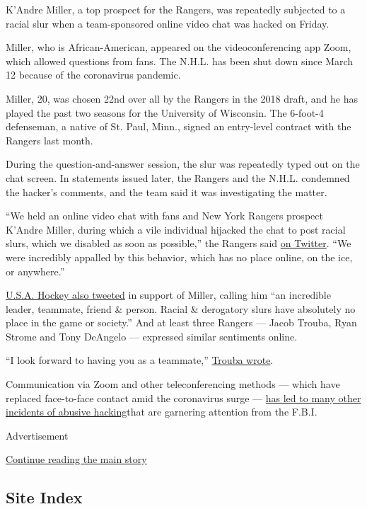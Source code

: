 K'Andre Miller, a top prospect for the Rangers, was repeatedly subjected
to a racial slur when a team-sponsored online video chat was hacked on
Friday.

Miller, who is African-American, appeared on the videoconferencing app
Zoom, which allowed questions from fans. The N.H.L. has been shut down
since March 12 because of the coronavirus pandemic.

Miller, 20, was chosen 22nd over all by the Rangers in the 2018 draft,
and he has played the past two seasons for the University of Wisconsin.
The 6-foot-4 defenseman, a native of St. Paul, Minn., signed an
entry-level contract with the Rangers last month.

During the question-and-answer session, the slur was repeatedly typed
out on the chat screen. In statements issued later, the Rangers and the
N.H.L. condemned the hacker's comments, and the team said it was
investigating the matter.

``We held an online video chat with fans and New York Rangers prospect
K'Andre Miller, during which a vile individual hijacked the chat to post
racial slurs, which we disabled as soon as possible,'' the Rangers said
\href{https://twitter.com/NYRangers/status/1246217625748697089?s=20}{on
Twitter}. ``We were incredibly appalled by this behavior, which has no
place online, on the ice, or anywhere.''

\href{https://twitter.com/usahockey/status/1246238904103002112?s=20}{U.S.A.
Hockey also tweeted} in support of Miller, calling him ``an incredible
leader, teammate, friend \& person. Racial \& derogatory slurs have
absolutely no place in the game or society.'' And at least three Rangers
--- Jacob Trouba, Ryan Strome and Tony DeAngelo --- expressed similar
sentiments online.

``I look forward to having you as a teammate,''
\href{https://twitter.com/JacobTrouba/status/1246239327618764803?s=20}{Trouba
wrote}.

Communication via Zoom and other teleconferencing methods --- which have
replaced face-to-face contact amid the coronavirus surge ---
\href{https://www.nytimes3xbfgragh.onion/2020/04/03/technology/zoom-harassment-abuse-racism-fbi-warning.html}{has
led to many other incidents of abusive hacking}that are garnering
attention from the F.B.I.

Advertisement

\protect\hyperlink{after-bottom}{Continue reading the main story}

\hypertarget{site-index}{%
\subsection{Site Index}\label{site-index}}

